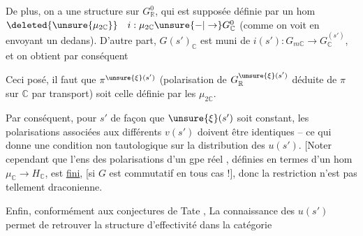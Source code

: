 
De plus, on a une structure  \inserted{$\pi$} sur $G^0_{\mathbb R}$, qui est  supposée définie par un hom
$\deleted{\unsure{\mu_{2\mathbb C}}}\quad i:\mu_{2\mathbb C}\unsure{-|\to}G^0_{\mathbb C}$
(comme on voit en envoyant un   dedans). D'autre part, $G(s')_{\mathbb C}$ est muni de $i(s'):G_{m\mathbb C}\to G^{(s')}_{\mathbb C}$, et on obtient par conséquent
\diagram{\[
\begin{tikzcd}[column sep=large]
\unsure{v|v_q}(s')=u(s')_{\mathbb C}\circ(i(s')\mid\mu_2):\ \mu_{2\mathbb C} \arrow[r] & G^{\unsure{\xi}(s')}_{\mathbb C}
\end{tikzcd}
\]}

 Ceci posé, il faut que $\pi^{\unsure{\xi}(s')}$ (polarisation de $G^{\unsure{\xi}(s')}_{\mathbb R}$ déduite de $\pi$ sur $\mathbb C$ par transport) soit celle définie par les $\mu_{2\mathbb C}$.

Par conséquent, pour $s'$  de façon que $\unsure{\xi}(s')$ soit constant, les polarisations  associées aux différents $v(s')$ doivent être identiques -- ce qui donne une condition non tautologique sur la distribution des  $u(s')$. [Noter cependant que l'ens des  polarisations d'un gpe réel , définies en termes d'un hom $\mu_{\mathbb C}\to H_{\mathbb C}$, est \uline{fini}, [si $G$ est commutatif en tous cas !], donc la restriction n'est pas tellement draconienne.

Enfin, conformément aux conjectures de Tate , La connaissance des $u(s')$ permet de retrouver la structure d'effectivité dans la catégorie


